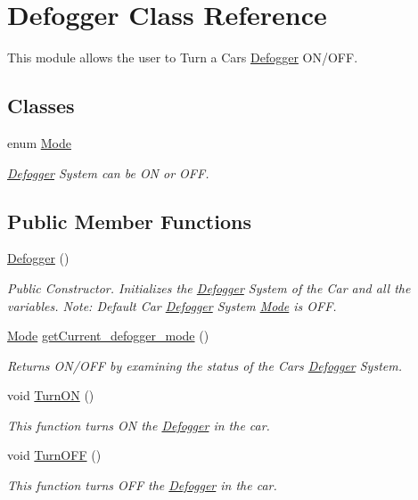 \hypertarget{class_defogger}{}\section{Defogger Class Reference}
\label{class_defogger}


This module allows the user to Turn a Car\textquotesingle{}s \hyperlink{class_defogger}{Defogger} O\+N/\+O\+F\+F.  


\subsection*{Classes}
\begin{DoxyCompactItemize}
\item 
enum \hyperlink{enum_defogger_1_1_mode}{Mode}
\begin{DoxyCompactList}\small\item\em \hyperlink{class_defogger}{Defogger} System can be O\+N or O\+F\+F. \end{DoxyCompactList}\end{DoxyCompactItemize}
\subsection*{Public Member Functions}
\begin{DoxyCompactItemize}
\item 
\hyperlink{class_defogger_a43f540a0982dbada3a41ae8adbe46125}{Defogger} ()
\begin{DoxyCompactList}\small\item\em Public Constructor. Initializes the \hyperlink{class_defogger}{Defogger} System of the Car and all the variables. Note\+: Default Car \hyperlink{class_defogger}{Defogger} System \hyperlink{enum_defogger_1_1_mode}{Mode} is O\+F\+F. \end{DoxyCompactList}\item 
\hyperlink{enum_defogger_1_1_mode}{Mode} \hyperlink{class_defogger_a20484c8ef30ca3d60b41d6e1819c1e06}{get\+Current\+\_\+defogger\+\_\+mode} ()
\begin{DoxyCompactList}\small\item\em Returns O\+N/\+O\+F\+F by examining the status of the Car\textquotesingle{}s \hyperlink{class_defogger}{Defogger} System. \end{DoxyCompactList}\item 
void \hyperlink{class_defogger_a6338997ee382229c2695e6e93b0b52c7}{Turn\+O\+N} ()
\begin{DoxyCompactList}\small\item\em This function turns O\+N the \hyperlink{class_defogger}{Defogger} in the car. \end{DoxyCompactList}\item 
void \hyperlink{class_defogger_a303c5504af3235d4d364044d0face77b}{Turn\+O\+F\+F} ()
\begin{DoxyCompactList}\small\item\em This function turns O\+F\+F the \hyperlink{class_defogger}{Defogger} in the car. \end{DoxyCompactList}\end{DoxyCompactItemize}


